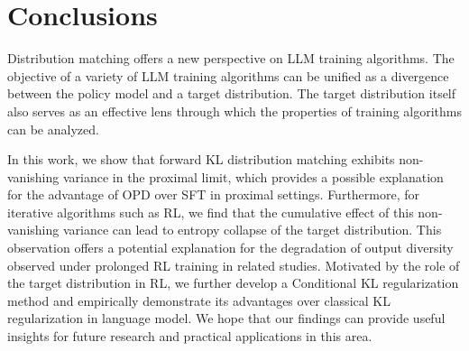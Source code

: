 \section{Conclusions}

Distribution matching offers a new perspective on LLM training algorithms. The objective of a variety of LLM training algorithms can be unified as a divergence between the policy model and a target distribution. The target distribution itself also serves as an effective lens through which the properties of training algorithms can be analyzed.

In this work, we show that forward KL distribution matching exhibits non-vanishing variance in the proximal limit, which provides a possible explanation for the advantage of OPD over SFT in proximal settings. Furthermore, for iterative algorithms such as RL, we find that the cumulative effect of this non-vanishing variance can lead to entropy collapse of the target distribution. This observation offers a potential explanation for the degradation of output diversity observed under prolonged RL training in related studies. Motivated by the role of the target distribution in RL, we further develop a Conditional KL regularization method and empirically demonstrate its advantages over classical KL regularization in language model. We hope that our findings can provide useful insights for future research and practical applications in this area.

%
%
